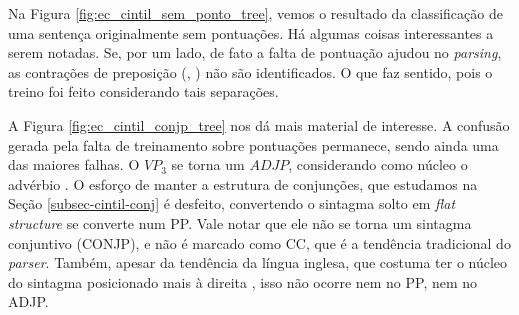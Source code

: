 \begin{center}
    
\end{center}

Na Figura \ref{fig:ec_cintil_sem_ponto_tree}, vemos o resultado da classificação de uma sentença originalmente sem pontuações. Há algumas coisas interessantes a serem notadas. Se, por um lado, de fato a falta de pontuação ajudou no \textit{parsing}, 
as contrações de preposição (, ) não são identificados. O que faz sentido, pois o treino foi feito considerando tais separações.

\begin{center}
    
\end{center}

A Figura \ref{fig:ec_cintil_conjp_tree} nos dá mais material de interesse. 
A confusão gerada pela falta de treinamento sobre pontuações permanece, sendo ainda uma das maiores falhas. O $VP_3$  se torna um $ADJP$, considerando como núcleo o advérbio . O esforço de manter a estrutura de conjunções, que estudamos na Seção \ref{subsec-cintil-conj} é desfeito, convertendo o sintagma solto em \textit{flat structure}  se converte num PP. Vale notar que ele não se torna um sintagma conjuntivo (CONJP), e  não é marcado como CC, que é a tendência tradicional do \textit{parser}. Também, apesar da tendência da língua inglesa, que costuma ter o núcleo do sintagma posicionado mais à direita \cite[p~40]{charniak97statistical}, isso não ocorre nem no PP, nem no ADJP.


